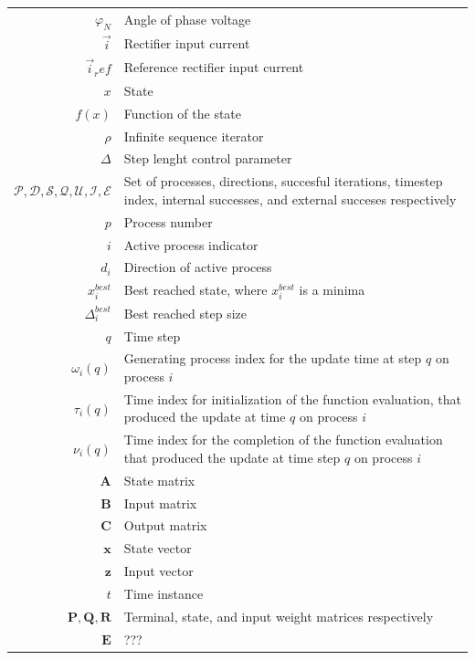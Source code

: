 \begin{longtable}{r l}
	$\varphi_N$												& Angle of phase voltage\\
	$\vec{i}$													& Rectifier input current\\
	$\vec{i}_ref$											& Reference rectifier input current\\
	$x$																& State\\
	$f(x)$														& Function of the state\\
	$\rho$																& Infinite sequence iterator\\
	$\Delta$													& Step lenght control parameter\\
	$\mathcal{P},\mathcal{D},\mathcal{S},\mathcal{Q},\mathcal{U},\mathcal{I},\mathcal{E}$ & Set of processes, directions, succesful iterations, timestep index, internal successes, and external succeses respectively\\
	$p$																& Process number\\
	$i$																& Active process indicator\\
	$d_i$															& Direction of active process\\
	$x_i^{best}$											& Best reached state, where $x_i^{best}$ is a minima\\
	$\Delta_i^{best}$											& Best reached step size\\
	$q$																& Time step\\
	$\omega_i(q)$ 										& Generating process index for the update time at step $q$ on process $i$\\
	$\tau_i(q)$												& Time index for initialization of the function evaluation, that produced the update at time $q$ on process $i$\\
	$\nu_i(q)$ 												& Time index for the completion of the function evaluation that produced the update at time step $q$ on process $i$\\
	$\textbf{A}$																& State matrix\\
	$\textbf{B}$																& Input matrix\\
	$\textbf{C}$																& Output matrix\\
	$\textbf{x}$											& State vector\\
	$\textbf{z}$											& Input vector\\
	$t$																& Time instance\\
	$\textbf{P}, \textbf{Q},\textbf{R}$ & Terminal, state, and input weight matrices respectively\\
	$\textbf{E}$																&???\\

\end{longtable}
